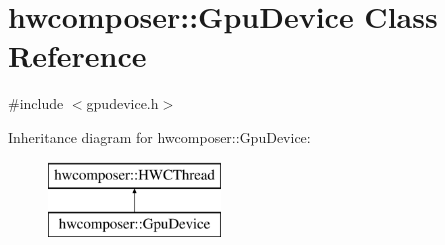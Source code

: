 \hypertarget{classhwcomposer_1_1GpuDevice}{}\section{hwcomposer\+:\+:Gpu\+Device Class Reference}
\label{classhwcomposer_1_1GpuDevice}


{\ttfamily \#include $<$gpudevice.\+h$>$}

Inheritance diagram for hwcomposer\+:\+:Gpu\+Device\+:\begin{figure}[H]
\begin{center}
\leavevmode
\includegraphics[height=2.000000cm]{classhwcomposer_1_1GpuDevice}
\end{center}
\end{figure}
